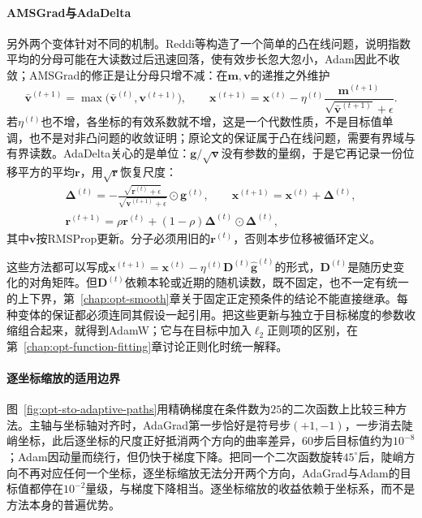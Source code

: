 \paragraph{AMSGrad与AdaDelta}
另外两个变体针对不同的机制。Reddi等构造了一个简单的凸在线问题，说明指数平均的分母可能在大读数过后迅速回落，使有效步长忽大忽小，Adam因此不收敛；AMSGrad的修正是让分母只增不减：在$\bm m,\bm v$的递推之外维护
\[
  \bar{\bm v}^{(t+1)}=\max\bigl(\bar{\bm v}^{(t)},\bm v^{(t+1)}\bigr),\qquad
  \bm x^{(t+1)}=\bm x^{(t)}-\eta^{(t)}\frac{\bm m^{(t+1)}}{\sqrt{\bar{\bm v}^{(t+1)}}+\epsilon}.
\]
若$\eta^{(t)}$也不增，各坐标的有效系数就不增，这是一个代数性质，不是目标值单调，也不是对非凸问题的收敛证明；原论文的保证属于凸在线问题，需要有界域与有界读数。AdaDelta关心的是单位：$\bm g/\sqrt{\bm v}$没有参数的量纲，于是它再记录一份位移平方的平均$\bm r$，用$\sqrt{\bm r}$恢复尺度：
\[
  \begin{gathered}
    \bm\Delta^{(t)}=-\frac{\sqrt{\bm r^{(t)}+\epsilon}}{\sqrt{\bm v^{(t+1)}+\epsilon}}\odot\bm g^{(t)},\qquad
    \bm x^{(t+1)}=\bm x^{(t)}+\bm\Delta^{(t)},\\
    \bm r^{(t+1)}=\rho\bm r^{(t)}+(1-\rho)\bm\Delta^{(t)}\odot\bm\Delta^{(t)},
  \end{gathered}
\]
其中$\bm v$按RMSProp更新。分子必须用旧的$\bm r^{(t)}$，否则本步位移被循环定义。

这些方法都可以写成$\bm x^{(t+1)}=\bm x^{(t)}-\eta^{(t)}\bm D^{(t)}\hat{\bm g}^{(t)}$的形式，$\bm D^{(t)}$是随历史变化的对角矩阵。但$\bm D^{(t)}$依赖本轮或近期的随机读数，既不固定，也不一定有统一的上下界，第~\ref{chap:opt-smooth}章关于固定正定预条件的结论不能直接继承。每种变体的保证都必须连同其假设一起引用。把这些更新与独立于目标梯度的参数收缩组合起来，就得到AdamW；它与在目标中加入$\ell_2$正则项的区别，在第~\ref{chap:opt-function-fitting}章讨论正则化时统一解释。

\paragraph{逐坐标缩放的适用边界}
图~\ref{fig:opt-sto-adaptive-paths}用精确梯度在条件数为$25$的二次函数上比较三种方法。主轴与坐标轴对齐时，AdaGrad第一步恰好是符号步$(+1,-1)$，一步消去陡峭坐标，此后逐坐标的尺度正好抵消两个方向的曲率差异，$60$步后目标值约为$10^{-8}$；Adam因动量而绕行，但仍快于梯度下降。把同一个二次函数旋转$45^\circ$后，陡峭方向不再对应任何一个坐标，逐坐标缩放无法分开两个方向，AdaGrad与Adam的目标值都停在$10^{-2}$量级，与梯度下降相当。逐坐标缩放的收益依赖于坐标系，而不是方法本身的普遍优势。

